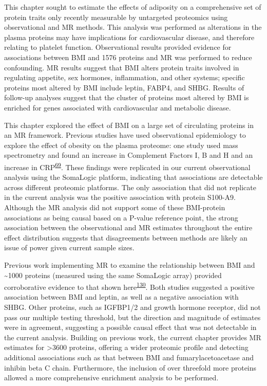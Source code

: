 \documentclass[11pt,twoside]{bristolthesis}
\begin{document}
This chapter sought to estimate the effects of adiposity on a comprehensive set of protein traits only recently measurable by untargeted proteomics using observational and MR methods. This analysis was performed as alterations in the plasma proteins may have implications for cardiovascular disease, and therefore relating to platelet function. Observational results provided evidence for associations between BMI and 1576 proteins and MR was performed to reduce confounding. MR results suggest that BMI alters protein traits involved in regulating appetite, sex hormones, inflammation, and other systems; specific proteins most altered by BMI include leptin, FABP4, and SHBG. Results of follow-up analyses suggest that the cluster of proteins most altered by BMI is enriched for genes associated with cardiovascular and metabolic disease.

This chapter explored the effect of BMI on a large set of circulating proteins in an MR framework. Previous studies have used observational epidemiology to explore the effect of obesity on the plasma proteome: one study used mass spectrometry and found an increase in Complement Factors I, B and H and an increase in CRP\textsuperscript{\protect\hyperlink{ref-Cominetti2018}{69}}. These findings were replicated in our current observational analysis using the SomaLogic platform, indicating that associations are detectable across different proteomic platforms. The only association that did not replicate in the current analysis was the positive association with protein S100-A9. Although the MR analysis did not support some of these BMI-protein associations as being causal based on a P-value reference point, the strong association between the observational and MR estimates throughout the entire effect distribution suggests that disagreements between methods are likely an issue of power given current sample sizes.

Previous work implementing MR to examine the relationship between BMI and \textasciitilde1000 proteins (measured using the same SomaLogic array) provided corroborative evidence to that shown here\textsuperscript{\protect\hyperlink{ref-Zaghlool2021}{130}}. Both studies suggested a positive association between BMI and leptin, as well as a negative association with SHBG. Other proteins, such as IGFBP1/2 and growth hormone receptor, did not pass our multiple testing threshold, but the direction and magnitude of estimates were in agreement, suggesting a possible causal effect that was not detectable in the current analysis. Building on previous work, the current chapter provides MR estimates for \textgreater3600 proteins, offering a wider proteomic profile and detecting additional associations such as that between BMI and fumarylacetoacetase and inhibin beta C chain. Furthermore, the inclusion of over threefold more proteins allowed a more comprehensive enrichment analysis to be performed.
\end{document}
